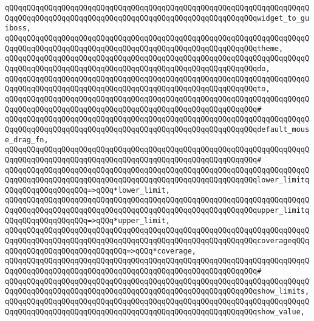 \verb|qQQqqQQqqQQqqQQqqQQqqQQqqQQqqQQqqQQqqQQqqQQqqQQqqQQqqQQqqQQqqQQqqQQqqQQqqQQqqQQqqQQqqQQqqQQqqQQqqQQqqQQqqQQqqQQqqQQqqQQqqQQqqQQqwidget_to_guiboss,|\newline
\verb|qQQqqQQqqQQqqQQqqQQqqQQqqQQqqQQqqQQqqQQqqQQqqQQqqQQqqQQqqQQqqQQqqQQqqQQqqQQqqQQqqQQqqQQqqQQqqQQqqQQqqQQqqQQqqQQqqQQqqQQqqQQqqQQqtheme,|\newline
\verb|qQQqqQQqqQQqqQQqqQQqqQQqqQQqqQQqqQQqqQQqqQQqqQQqqQQqqQQqqQQqqQQqqQQqqQQqqQQqqQQqqQQqqQQqqQQqqQQqqQQqqQQqqQQqqQQqqQQqqQQqqQQqqQQqdo,|\newline
\verb|qQQqqQQqqQQqqQQqqQQqqQQqqQQqqQQqqQQqqQQqqQQqqQQqqQQqqQQqqQQqqQQqqQQqqQQqqQQqqQQqqQQqqQQqqQQqqQQqqQQqqQQqqQQqqQQqqQQqqQQqqQQqqQQqto,|\newline
\verb|qQQqqQQqqQQqqQQqqQQqqQQqqQQqqQQqqQQqqQQqqQQqqQQqqQQqqQQqqQQqqQQqqQQqqQQqqQQqqQQqqQQqqQQqqQQqqQQqqQQqqQQqqQQqqQQqqQQqqQQqqQQqqQQq#|\newline
\verb|qQQqqQQqqQQqqQQqqQQqqQQqqQQqqQQqqQQqqQQqqQQqqQQqqQQqqQQqqQQqqQQqqQQqqQQqqQQqqQQqqQQqqQQqqQQqqQQqqQQqqQQqqQQqqQQqqQQqqQQqqQQqqQQqdefault_mouse_drag_fn,|\newline
\verb|qQQqqQQqqQQqqQQqqQQqqQQqqQQqqQQqqQQqqQQqqQQqqQQqqQQqqQQqqQQqqQQqqQQqqQQqqQQqqQQqqQQqqQQqqQQqqQQqqQQqqQQqqQQqqQQqqQQqqQQqqQQqqQQq#|\newline
\verb|qQQqqQQqqQQqqQQqqQQqqQQqqQQqqQQqqQQqqQQqqQQqqQQqqQQqqQQqqQQqqQQqqQQqqQQqqQQqqQQqqQQqqQQqqQQqqQQqqQQqqQQqqQQqqQQqqQQqqQQqqQQqqQQqlower_limitqQQqqQQqqQQqqQQqqQQq=>qQQq*lower_limit,|\newline
\verb|qQQqqQQqqQQqqQQqqQQqqQQqqQQqqQQqqQQqqQQqqQQqqQQqqQQqqQQqqQQqqQQqqQQqqQQqqQQqqQQqqQQqqQQqqQQqqQQqqQQqqQQqqQQqqQQqqQQqqQQqqQQqqQQqupper_limitqQQqqQQqqQQqqQQqqQQq=>qQQq*upper_limit,|\newline
\verb|qQQqqQQqqQQqqQQqqQQqqQQqqQQqqQQqqQQqqQQqqQQqqQQqqQQqqQQqqQQqqQQqqQQqqQQqqQQqqQQqqQQqqQQqqQQqqQQqqQQqqQQqqQQqqQQqqQQqqQQqqQQqqQQqcoverageqQQqqQQqqQQqqQQqqQQqqQQqqQQqqQQq=>qQQq*coverage,|\newline
\verb|qQQqqQQqqQQqqQQqqQQqqQQqqQQqqQQqqQQqqQQqqQQqqQQqqQQqqQQqqQQqqQQqqQQqqQQqqQQqqQQqqQQqqQQqqQQqqQQqqQQqqQQqqQQqqQQqqQQqqQQqqQQqqQQq#|\newline
\verb|qQQqqQQqqQQqqQQqqQQqqQQqqQQqqQQqqQQqqQQqqQQqqQQqqQQqqQQqqQQqqQQqqQQqqQQqqQQqqQQqqQQqqQQqqQQqqQQqqQQqqQQqqQQqqQQqqQQqqQQqqQQqqQQqshow_limits,|\newline
\verb|qQQqqQQqqQQqqQQqqQQqqQQqqQQqqQQqqQQqqQQqqQQqqQQqqQQqqQQqqQQqqQQqqQQqqQQqqQQqqQQqqQQqqQQqqQQqqQQqqQQqqQQqqQQqqQQqqQQqqQQqqQQqqQQqshow_value,|\newline
